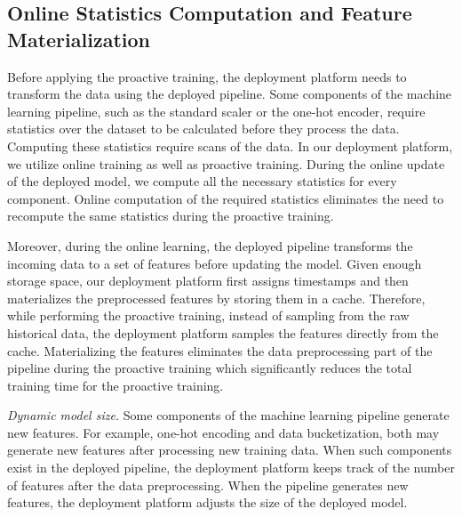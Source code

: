 \subsection{Online Statistics Computation and Feature Materialization}
Before applying the proactive training, the deployment platform needs to transform the data using the deployed pipeline.
Some components of the machine learning pipeline, such as the standard scaler or the one-hot encoder, require statistics over the dataset to be calculated before they process the data.
Computing these statistics require scans of the data.
In our deployment platform, we utilize online training as well as proactive training.
During the online update of the deployed model, we compute all the necessary statistics for every component.
Online computation of the required statistics eliminates the need to recompute the same statistics during the proactive training.

Moreover, during the online learning, the deployed pipeline transforms the incoming data to a set of features before updating the model.
Given enough storage space, our deployment platform first assigns timestamps and then materializes the preprocessed features by storing them in a cache.
Therefore, while performing the proactive training, instead of sampling from the raw historical data, the deployment platform samples the features directly from the cache.
Materializing the features eliminates the data preprocessing part of the pipeline during the proactive training which significantly reduces the total training time for the proactive training.

\textit{Dynamic model size.}
Some components of the machine learning pipeline generate new features.
For example, one-hot encoding and data bucketization, both may generate new features after processing new training data.
When such components exist in the deployed pipeline, the deployment platform keeps track of the number of features after the data preprocessing.
When the pipeline generates new features, the deployment platform adjusts the size of the deployed model.

